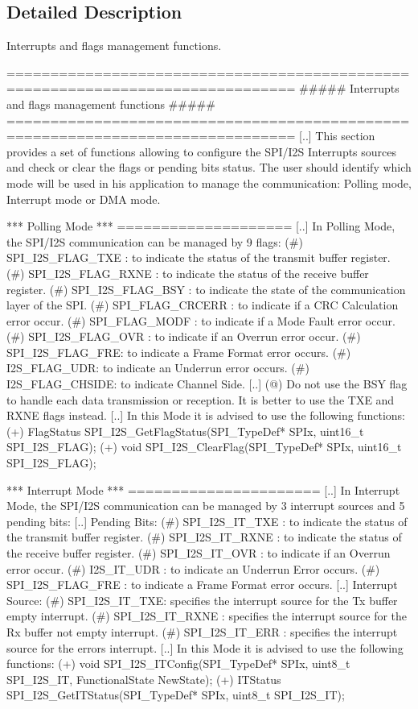 \subsection{Detailed Description}
Interrupts and flags management functions. \begin{DoxyVerb} ===============================================================================
              ##### Interrupts and flags management functions #####
 ===============================================================================  
    [..] This section provides a set of functions allowing to configure the SPI/I2S 
         Interrupts sources and check or clear the flags or pending bits status.
         The user should identify which mode will be used in his application to manage 
         the communication: Polling mode, Interrupt mode or DMA mode. 
    
  *** Polling Mode ***
  ====================
    [..] In Polling Mode, the SPI/I2S communication can be managed by 9 flags:
         (#) SPI_I2S_FLAG_TXE : to indicate the status of the transmit buffer register.
         (#) SPI_I2S_FLAG_RXNE : to indicate the status of the receive buffer register.
         (#) SPI_I2S_FLAG_BSY : to indicate the state of the communication layer of the SPI.
         (#) SPI_FLAG_CRCERR : to indicate if a CRC Calculation error occur.              
         (#) SPI_FLAG_MODF : to indicate if a Mode Fault error occur.
         (#) SPI_I2S_FLAG_OVR : to indicate if an Overrun error occur.
         (#) SPI_I2S_FLAG_FRE: to indicate a Frame Format error occurs.
         (#) I2S_FLAG_UDR: to indicate an Underrun error occurs.
         (#) I2S_FLAG_CHSIDE: to indicate Channel Side.
    [..]
         (@) Do not use the BSY flag to handle each data transmission or reception.
             It is better to use the TXE and RXNE flags instead.
    [..] In this Mode it is advised to use the following functions:
         (+) FlagStatus SPI_I2S_GetFlagStatus(SPI_TypeDef* SPIx, uint16_t SPI_I2S_FLAG);
         (+) void SPI_I2S_ClearFlag(SPI_TypeDef* SPIx, uint16_t SPI_I2S_FLAG);

  *** Interrupt Mode ***
  ======================
    [..] In Interrupt Mode, the SPI/I2S communication can be managed by 3 interrupt sources
         and 5 pending bits: 
    [..] Pending Bits:
         (#) SPI_I2S_IT_TXE : to indicate the status of the transmit buffer register.
         (#) SPI_I2S_IT_RXNE : to indicate the status of the receive buffer register.
         (#) SPI_I2S_IT_OVR : to indicate if an Overrun error occur.
         (#) I2S_IT_UDR : to indicate an Underrun Error occurs.
         (#) SPI_I2S_FLAG_FRE : to indicate a Frame Format error occurs.
    [..] Interrupt Source:
         (#) SPI_I2S_IT_TXE: specifies the interrupt source for the Tx buffer empty 
             interrupt.  
         (#) SPI_I2S_IT_RXNE : specifies the interrupt source for the Rx buffer not 
             empty interrupt.
         (#) SPI_I2S_IT_ERR : specifies the interrupt source for the errors interrupt.
    [..] In this Mode it is advised to use the following functions:
         (+) void SPI_I2S_ITConfig(SPI_TypeDef* SPIx, uint8_t SPI_I2S_IT, FunctionalState NewState);
         (+) ITStatus SPI_I2S_GetITStatus(SPI_TypeDef* SPIx, uint8_t SPI_I2S_IT);


\end{DoxyVerb}
